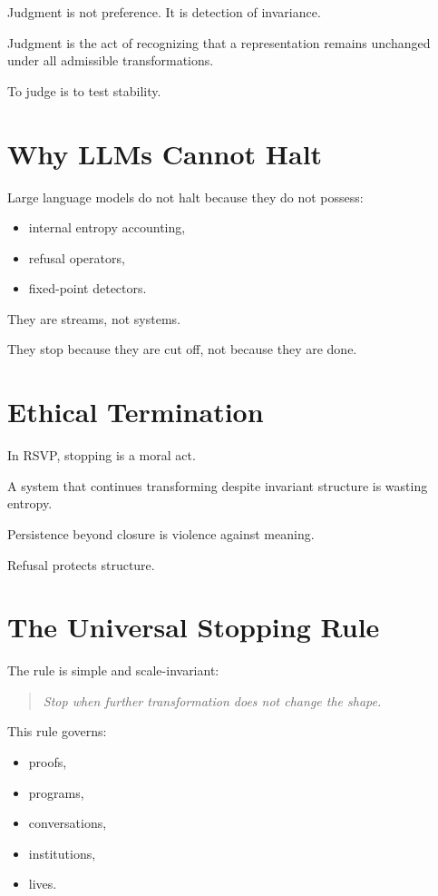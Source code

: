 \documentclass[11pt]{book}
\begin{document}
Judgment is not preference.
It is detection of invariance.

\begin{definition}[Judgment]
Judgment is the act of recognizing that a representation remains unchanged under
all admissible transformations.
\end{definition}

To judge is to test stability.

\section{Why LLMs Cannot Halt}

Large language models do not halt because they do not possess:

\begin{itemize}
\item internal entropy accounting,
\item refusal operators,
\item fixed-point detectors.
\end{itemize}

They are streams, not systems.

They stop because they are cut off, not because they are done.

\section{Ethical Termination}

In RSVP, stopping is a moral act.

A system that continues transforming despite invariant structure is wasting
entropy.

Persistence beyond closure is violence against meaning.

Refusal protects structure.

\section{The Universal Stopping Rule}

The rule is simple and scale-invariant:

\begin{quote}
\emph{Stop when further transformation does not change the shape.}
\end{quote}

This rule governs:

\begin{itemize}
\item proofs,
\item programs,
\item conversations,
\item institutions,
\item lives.
\end{itemize}
\end{document}
